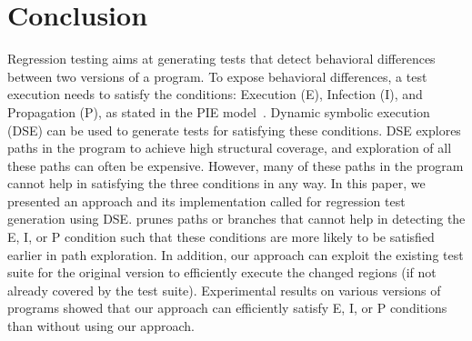 \section{Conclusion}
\label{sec:conclusion}
Regression testing aims at generating tests that detect behavioral differences between two versions of a program. To expose behavioral differences, a test execution needs to satisfy the conditions: Execution (E), Infection (I), and Propagation (P), as stated in the PIE model~\cite{voas}. Dynamic symbolic execution (DSE) can be used to generate tests for satisfying these conditions. DSE explores paths in the program to achieve high structural coverage, and exploration of all these paths can often be expensive. However, many of these paths in the program cannot help in satisfying the three conditions in any way. In this paper, we presented an approach and its implementation called  for regression test generation using DSE.  prunes paths or branches that cannot help in detecting the E, I, or P condition such that these conditions are more likely to be satisfied earlier in path exploration. In addition, our approach can exploit the existing test suite for the original version to efficiently execute the changed regions (if not already covered by the test suite). 
Experimental results on various versions of programs showed that our approach can efficiently satisfy E, I, or P conditions than without using our approach. 
